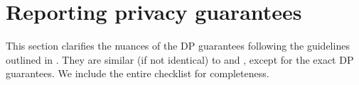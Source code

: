 
\clearpage
\section{Reporting privacy guarantees}\label{app:privacy-guarantees}
This section clarifies the nuances of the DP guarantees following the guidelines outlined in \citep[Sec. 5.3]{ponomareva2023dpfy}. They are similar (if not identical)  to \citep[Appendix A]{xu2023federated} and \citep[Appendix C.3]{wu2024prompt}, except for the exact DP guarantees. We include the entire checklist for completeness.

